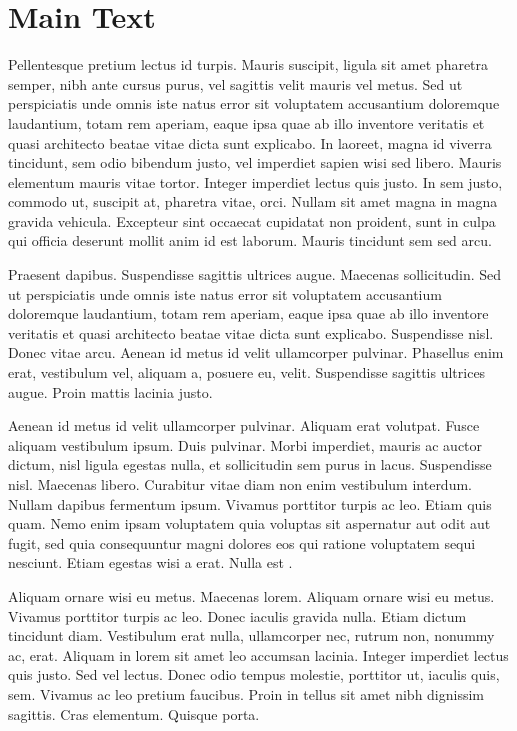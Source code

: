 \section{Main Text}

Pellentesque pretium lectus id turpis. Mauris suscipit, ligula sit amet pharetra semper, nibh ante cursus purus, vel sagittis velit mauris vel metus. Sed ut perspiciatis unde omnis iste natus error sit voluptatem accusantium doloremque laudantium, totam rem aperiam, eaque ipsa quae ab illo inventore veritatis et quasi architecto beatae vitae dicta sunt explicabo. In laoreet, magna id viverra tincidunt, sem odio bibendum justo, vel imperdiet sapien wisi sed libero. Mauris elementum mauris vitae tortor. Integer imperdiet lectus quis justo. In sem justo, commodo ut, suscipit at, pharetra vitae, orci. Nullam sit amet magna in magna gravida vehicula. Excepteur sint occaecat cupidatat non proident, sunt in culpa qui officia deserunt mollit anim id est laborum. Mauris tincidunt sem sed arcu.

Praesent dapibus. Suspendisse sagittis ultrices augue. Maecenas sollicitudin. Sed ut perspiciatis unde omnis iste natus error sit voluptatem accusantium doloremque laudantium, totam rem aperiam, eaque ipsa quae ab illo inventore veritatis et quasi architecto beatae vitae dicta sunt explicabo. Suspendisse nisl. Donec vitae arcu. Aenean id metus id velit ullamcorper pulvinar. Phasellus enim erat, vestibulum vel, aliquam a, posuere eu, velit. Suspendisse sagittis ultrices augue. Proin mattis lacinia justo.

Aenean id metus id velit ullamcorper pulvinar. Aliquam erat volutpat. Fusce aliquam vestibulum ipsum. Duis pulvinar. Morbi imperdiet, mauris ac auctor dictum, nisl ligula egestas nulla, et sollicitudin sem purus in lacus. Suspendisse nisl. Maecenas libero. Curabitur vitae diam non enim vestibulum interdum. Nullam dapibus fermentum ipsum. Vivamus porttitor turpis ac leo. Etiam quis quam. Nemo enim ipsam voluptatem quia voluptas sit aspernatur aut odit aut fugit, sed quia consequuntur magni dolores eos qui ratione voluptatem sequi nesciunt. Etiam egestas wisi a erat. Nulla est \cite{thrun2005probabilistic}.

Aliquam ornare wisi eu metus. Maecenas lorem. Aliquam ornare wisi eu metus. Vivamus porttitor turpis ac leo. Donec iaculis gravida nulla. Etiam dictum tincidunt diam. Vestibulum erat nulla, ullamcorper nec, rutrum non, nonummy ac, erat. Aliquam in lorem sit amet leo accumsan lacinia. Integer imperdiet lectus quis justo. Sed vel lectus. Donec odio tempus molestie, porttitor ut, iaculis quis, sem. Vivamus ac leo pretium faucibus. Proin in tellus sit amet nibh dignissim sagittis. Cras elementum. Quisque porta.

